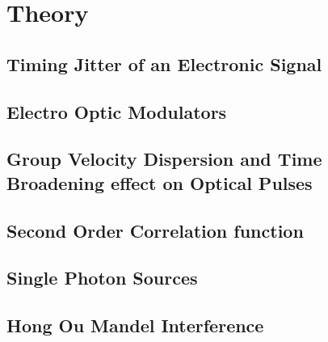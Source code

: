 \chapter{Theory}

\section{Timing Jitter of an Electronic Signal}
\section{Electro Optic Modulators}
\section{Group Velocity Dispersion and Time Broadening effect on Optical Pulses}
\section{Second Order Correlation function}
\section{Single Photon Sources}
\section{Hong Ou Mandel Interference}